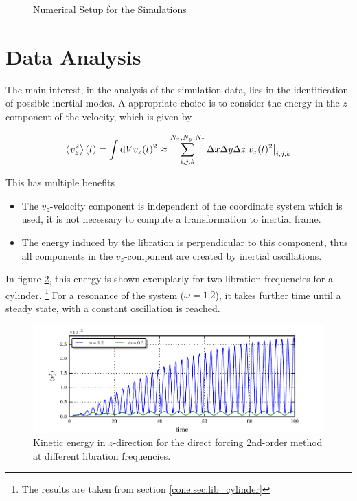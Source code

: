 \begin{figure}[!bp]
  \centering
      \caption{Numerical Setup for the Simulations \label{cone:setup_image} }
\end{figure}
\clearpage

\section{Data Analysis}

The main interest, in the analysis of the simulation data, lies in the identification of possible inertial modes.
A appropriate choice is to consider the energy in the $z$-component of the  velocity, which is given by

\begin{align}
    \left<v_z^2 \right>(t) =  \int \mathop{}\!\mathrm{d} V v_z(t)^2 \approx \sum_{i, j, k}^{N_x,N_y,N_z} \Delta x \Delta y \Delta z \left.v_z(t)^2 \right|_{i,j,k}
\end{align}

This has multiple benefits

\begin{itemize}
    \item The $v_z$-velocity component is independent of the coordinate system which is used, it is not necessary
                to compute a transformation to inertial frame.
    \item The energy induced by the libration is perpendicular to this component, thus all components
            in the $v_z$-component are created by inertial oscillations.
\end{itemize}

In figure \ref{fig:cone:cyl_vzmode}, this energy is shown exemplarly for two libration frequencies for a cylinder.
\footnote{The results are taken from section \ref{cone:sec:lib_cylinder}}
For a resonance of the system ($\omega=1.2$), it takes further time until a steady state, with a constant oscillation is reached.

\begin{figure}[!pb]
  \includegraphics{gfx/cone/cylinder/cyl_vz.pdf}
  \caption{Kinetic energy in $z$-direction for the direct forcing 2nd-order method at different libration frequencies.
  \label{fig:cone:cyl_vzmode}
  }
\end{figure}
\clearpage

